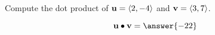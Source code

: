 \documentclass{ximera}
\author{Gregory Hartman \and Matthew Carr}
\begin{document}
\begin{exercise}




Compute the dot product of $\mathbf{u}=\left\langle 2,-4\right\rangle$ and $\mathbf{v}=\left\langle 3,7\right\rangle$.

\begin{prompt}
\[
\vec{u}\dotp\vec{v}=\answer{-22}
\]
\end{prompt}

\end{exercise}
\end{document}
